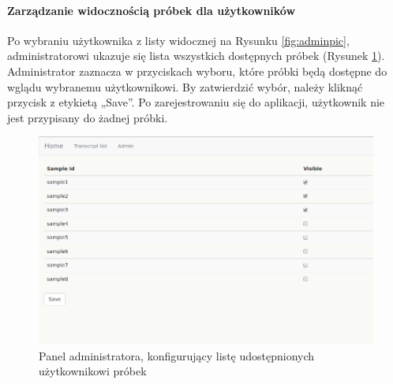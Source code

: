 \documentclass[a4paper,12pt,twoside]{article}
\begin{document}
\newpage
\paragraph{Zarządzanie widocznością próbek dla użytkowników}
Po wybraniu użytkownika z listy widocznej na Rysunku \ref{fig:adminpic},
administratorowi ukazuje się lista wszystkich dostępnych próbek (Rysunek \ref{fig:user_priviligespic}). Administrator zaznacza w przyciskach wyboru, które próbki będą dostępne
do wglądu wybranemu użytkownikowi. By zatwierdzić wybór, należy kliknąć
przycisk z etykietą „Save”.
Po zarejestrowaniu się do aplikacji, użytkownik nie jest przypisany do żadnej próbki.

\begin{figure}[h]
\centering
\includegraphics[width=\textwidth]{obrazy/aplikacja/user_priviliges.png}
\caption{Panel administratora, konfigurujący listę udostępnionych użytkownikowi próbek}
\label{fig:user_priviligespic}
\end{figure}

\newpage
{}
\end{document}
